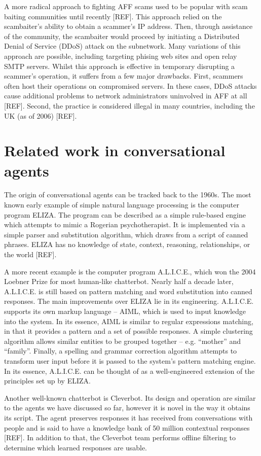 A more radical approach to fighting AFF scams used to be popular with scam baiting communities until recently [REF]. This approach relied on the scambaiter's ability to obtain a scammer's IP address. Then, through assistance of the community, the scambaiter would proceed by initiating a Distributed Denial of Service (DDoS) attack on the subnetwork. Many variations of this approach are possible, including targeting phising web sites and open relay SMTP servers. Whilst this approach is effective in temporary disrupting a scammer's operation, it suffers from a few major drawbacks. First, scammers often host their operations on compromised servers. In these cases, DDoS attacks cause additional problems to network administrators uninvolved in AFF at all [REF]. Second, the practice is considered illegal in many countries, including the UK (as of 2006) [REF].

\section{Related work in conversational agents}
The origin of conversational agents can be tracked back to the 1960s. The most known early example of simple natural language processing is the computer program ELIZA. The program can be described as a simple rule-based engine which attempts to mimic a Rogerian psychotherapist. It is implemented via a simple parser and substitution algorithm, which draws from a script of canned phrases. ELIZA has no knowledge of state, context, reasoning, relationships, or the world [REF].

A more recent example is the computer program A.L.I.C.E., which won the 2004 Loebner Prize for most human-like chatterbot. Nearly half a decade later, A.L.I.C.E. is still based on pattern matching and word substitution into canned responses. The main improvements over ELIZA lie in its engineering. A.L.I.C.E. supports its own markup language – AIML, which is used to input knowledge into the system. In its essence, AIML is similar to regular expressions matching, in that it provides a pattern and a set of possible responses. A simple clustering algorithm allows similar entities to be grouped together – e.g. “mother” and “family”. Finally, a spelling and grammar correction algorithm attempts to transform user input before it is passed to the system's pattern matching engine. In its essence, A.L.I.C.E. can be thought of as a well-engineered extension of the principles set up by ELIZA.

Another well-known chatterbot is Cleverbot. Its design and operation are similar to the agents we have discussed so far, however it is novel in the way it obtains its script. The agent preserves responses it has received from conversations with people and is said to have a knowledge bank of 50 million contextual responses [REF]. In addition to that, the Cleverbot team performs offline filtering to determine which learned responses are usable.

